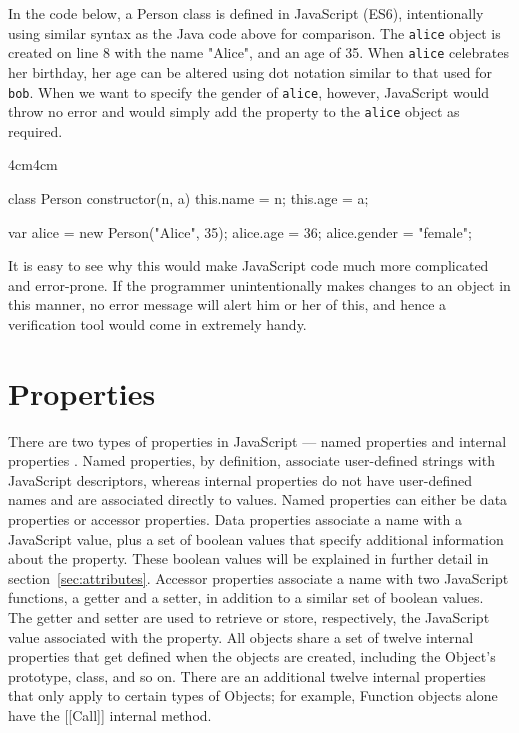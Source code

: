 \documentclass[a4paper,11pt,twoside]{report}
\def\jsinline{\lstinline[language=JavaScript, basicstyle=\small]}%\end{lstlisting}
\begin{document}
In the code below, a Person class is defined in JavaScript (ES6), intentionally using similar syntax as the Java code above for comparison. The \jsinline|alice| object is created on line 8 with the name "Alice", and an age of 35. When \jsinline|alice| celebrates her birthday, her age can be altered using dot notation similar to that used for \jsinline|bob|. When we want to specify the gender of \jsinline|alice|, however, JavaScript would throw no error and would simply add the property to the \jsinline|alice| object as required.
\begin{adjustwidth}{4cm}{4cm}
\begin{lstjs}
class Person {
	constructor(n, a) {
		this.name = n;
		this.age = a;
	}
}

var alice = new Person("Alice", 35);
alice.age = 36;
alice.gender = "female";
\end{lstjs}
\end{adjustwidth}

It is easy to see why this would make JavaScript code much more complicated and error-prone. If the programmer unintentionally makes changes to an object in this manner, no error message will alert him or her of this, and hence a verification tool would come in extremely handy.

\section{Properties}
There are two types of properties in JavaScript --- named properties and internal properties \cite{EcmaScript}. Named properties, by definition, associate user-defined strings with JavaScript descriptors, whereas internal properties do not have user-defined names and are associated directly to values. Named properties can either be data properties or accessor properties. Data properties associate a name with a JavaScript value, plus a set of boolean values that specify additional information about the property. These boolean values will be explained in further detail in section~\ref{sec:attributes}. Accessor properties associate a name with two JavaScript functions, a getter and a setter, in addition to a similar set of boolean values. The getter and setter are used to retrieve or store, respectively, the JavaScript value associated with the property. All objects share a set of twelve internal properties that get defined when the objects are created, including the Object's prototype, class, and so on. There are an additional twelve internal properties that only apply to certain types of Objects; for example, Function objects alone have the [[Call]] internal method.
\end{document}
